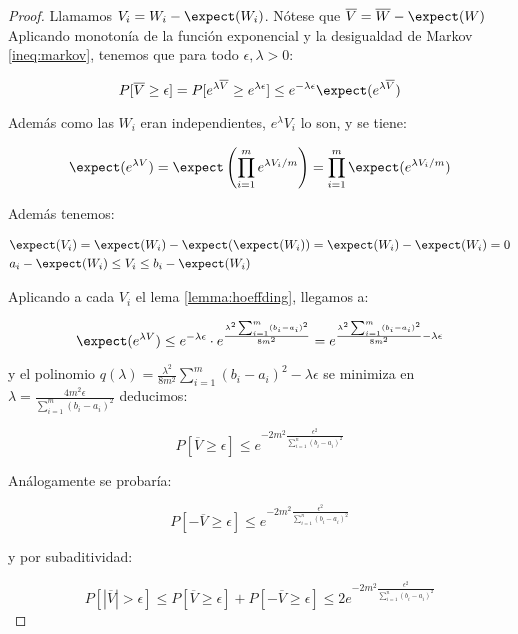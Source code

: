 \begin{proof}
 Llamamos $V_i = W_i - \expect(W_i)$. Nótese que $\overline{V} = \overline{W} - \expect(W)$
 Aplicando monotonía de la función exponencial y la desigualdad de Markov \ref{ineq:markov}, tenemos que 
 para todo $\epsilon, \lambda > 0$:
 
 \[P[\overline{V} \ge \epsilon] = P[e^{\lambda\overline{V}} \ge e^{\lambda \epsilon}]
 \le e^{-\lambda \epsilon} \expect(e^{\lambda \overline{V}})\]
 
 Además como las $W_i$ eran independientes, $e^\lambda V_i$ lo son, y se tiene:
 
 \[\expect(e^{\lambda V}) = \expect\left(\prod_{i=1}^m e^{\lambda V_i / m}\right) = \prod_{i=1}^m \expect(e^{\lambda V_i/m})\]
 
 Además tenemos:
 
 \begin{align*}
  & \expect(V_i) = \expect(W_i) - \expect(\expect(W_i)) = \expect(W_i) - \expect(W_i) = 0  \\
  & a_i-\expect(W_i) \le V_i \le b_i-\expect(W_i)
 \end{align*}
 
 Aplicando a cada $V_i$ el lema \ref{lemma:hoeffding}, llegamos a:
 
 \[\expect(e^{\lambda V}) \le e^{-\lambda \epsilon} \cdot e^{\frac{\lambda^2 \sum_{i=1}^m(b_i-a_i)^2}{8m^2}} = 
  e^{\frac{\lambda^2 \sum_{i=1}^m(b_i-a_i)^2}{8m^2} - \lambda\epsilon}\]
 
 y el polinomio $q(\lambda)= \frac{\lambda^2}{8m^2} \sum_{i=1}^m(b_i-a_i)^2 - \lambda\epsilon$ se minimiza en 
 $\lambda = \frac{4m^2\epsilon}{\sum_{i=1}^m(b_i-a_i)^2}$ deducimos:
 
 \[P[\overline{V} \ge \epsilon] \le e^{-2m^2 \frac{\epsilon^2}{\sum_{i=1}^n (b_i-a_i)^2}}\]
 
 Análogamente se probaría:
 
 \[P[-\overline{V} \ge \epsilon] \le e^{-2m^2 \frac{\epsilon^2}{\sum_{i=1}^n (b_i-a_i)^2}}\]
 
 
 y por subaditividad: 
 
 \[P[|\overline{V}| > \epsilon] \le P[\overline{V} \ge \epsilon] + P[-\overline{V} \ge \epsilon]
 \le 2e^{-2m^2 \frac{\epsilon^2}{\sum_{i=1}^n (b_i-a_i)^2}}\]
 
\end{proof}
